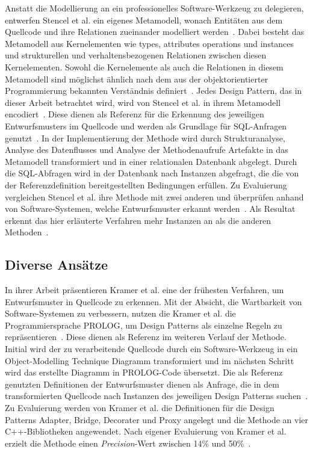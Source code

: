 Anstatt die Modellierung an ein professionelles Software-Werkzeug zu delegieren, entwerfen Stencel et al. ein eigenes Metamodell, wonach Entitäten aus dem Quellcode und ihre Relationen zueinander modelliert werden~\cite[S. 27]{stencel-2008}.
Dabei besteht das Metamodell aus Kernelementen wie types, attributes operations und instances und strukturellen und verhaltensbezogenen Relationen zwischen diesen Kernelementen. Sowohl die Kernelemente als auch die Relationen in diesem Metamodell sind möglichst ähnlich nach dem aus der objektorientierter Programmierung bekannten Verständnis definiert~\cite[S. 27]{stencel-2008}.
Jedes Design Pattern, das in dieser Arbeit betrachtet wird, wird von Stencel et al. in ihrem  Metamodell encodiert~\cite[S.28 - 29]{stencel-2008}. Diese dienen als Referenz für die Erkennung des jeweiligen Entwurfsmusters im Quellcode und werden als Grundlage für SQL-Anfragen genutzt~\cite[S. 29]{stencel-2008}.
In der Implementierung der Methode wird durch Strukturanalyse, Analyse des Datenflusses und Analyse der Methodenaufrufe Artefakte in das Metamodell transformiert und in einer relationalen Datenbank abgelegt.
Durch die SQL-Abfragen wird in der Datenbank nach Instanzen abgefragt, die die von der Referenzdefinition bereitgestellten Bedingungen erfüllen.
Zu Evaluierung vergleichen Stencel et al. ihre Methode mit zwei anderen und überprüfen anhand von Software-Systemen, welche Entwurfsmuster erkannt werden~\cite[S. 30]{stencel-2008}.
Als Resultat erkennt das hier erläuterte Verfahren mehr Instanzen an als die anderen Methoden~\cite[S. 29]{stencel-2008}.

\subsection{Diverse Ansätze}

In ihrer Arbeit präsentieren Kramer et al. eine der frühesten Verfahren, um Entwurfsmuster in Quellcode zu erkennen.
Mit der Absicht, die Wartbarkeit von Software-Systemen zu verbessern, nutzen die Kramer et al. die Programmiersprache PROLOG, um 
Design Patterns als einzelne Regeln zu repräsentieren~\cite[S. 2]{Krammer-1996}. Diese dienen als Referenz im weiteren Verlauf der Methode.
Initial wird der zu verarbeitende Quellcode durch ein Software-Werkzeug in ein Object-Modelling Technique Diagramm transformiert und im nächsten Schritt wird das erstellte Diagramm in PROLOG-Code übersetzt.
Die als Referenz genutzten Definitionen der Entwurfsmuster dienen als Anfrage, die in dem transformierten Quellcode nach Instanzen des jeweiligen Design Patterns suchen~\cite[S. 2]{Krammer-1996}.
Zu Evaluierung werden von Kramer et al. die Definitionen für die Design Patterns Adapter, Bridge, Decorater und Proxy angelegt und die Methode an vier C++-Bibliotheken angewendet.
Nach eigener Evaluierung von Kramer et al. erzielt die Methode einen \textit{Precision}-Wert zwischen 14\% und 50\%~\cite[S. 7]{Krammer-1996}.


